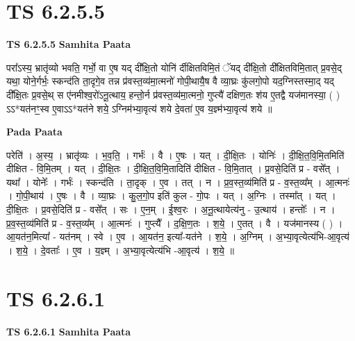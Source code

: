 \documentclass[17pt]{extarticle}
\begin{document}
\section*{ TS 6.2.5.5 }

\textbf{TS 6.2.5.5 } \newline
\textbf{Samhita Paata} \newline

परा᳚ऽस्य॒ भ्रातृ॑व्यो भवति॒ गर्भो॒ वा ए॒ष यद् दी᳚क्षि॒तो योनि॑ र्दीक्षितविमि॒तं ॅयद् दी᳚क्षि॒तो दी᳚क्षितविमि॒तात् प्र॒वसे॒द् यथा॒ योने॒र्गर्भः॒ स्कन्द॑ति ता॒दृगे॒व तन्न प्र॑वस्त॒व्य॑मा॒त्मनो॑ गोपी॒थायै॒ष वै व्या॒घ्रः कु॑लगो॒पो यद॒ग्निस्तस्मा॒द् यद् दी᳚क्षि॒तः प्र॒वसे॒थ् स ए॑नमीश्व॒रो॑ऽनू॒त्थाय॒ हन्तो॒र्न प्र॑वस्त॒व्य॑मा॒त्मनो॒ गुप्त्यै॑ दक्षिण॒तः श॑य ए॒तद्वै यज॑मानस्या॒ ( ) ऽऽ*यत॑नꣳ॒॒स्व ए॒वाऽऽ*यत॑ने शये॒ ऽग्निम॑भ्या॒वृत्य॑ शये दे॒वता॑ ए॒व य॒ज्ञ्म॑भ्या॒वृत्य॑ शये ॥ \newline

\textbf{Pada Paata} \newline

परेति॑ । अ॒स्य॒ । भ्रातृ॑व्यः । भ॒व॒ति॒ । गर्भः॑ । वै । ए॒षः । यत् । दी॒क्षि॒तः । योनिः॑ । दी॒क्षि॒त॒वि॒मि॒तमिति॑ दीक्षित - वि॒मि॒तम् । यत् । दी॒क्षि॒तः । दी॒क्षि॒त॒वि॒मि॒तादिति॑ दीक्षित - वि॒मि॒तात् । प्र॒वसे॒दिति॑ प्र - वसे᳚त् । यथा᳚ । योनेः᳚ । गर्भः॑ । स्कन्द॑ति । ता॒दृक् । ए॒व । तत् । न । प्र॒व॒स्त॒व्य॑मिति॑ प्र - व॒स्त॒व्य᳚म् । आ॒त्मनः॑ । गो॒पी॒थाय॑ । ए॒षः । वै । व्या॒घ्रः । कु॒ल॒गो॒प इति॑ कुल - गो॒पः । यत् । अ॒ग्निः । तस्मा᳚त् । यत् । दी॒क्षि॒तः । प्र॒वसे॒दिति॑ प्र - वसे᳚त् । सः । ए॒न॒म् । ई॒श्व॒रः । अ॒नू॒त्थायेत्य॑नु - उ॒त्थाय॑ । हन्तोः᳚ । न । प्र॒व॒स्त॒व्य॑मिति॑ प्र - व॒स्त॒व्य᳚म् । आ॒त्मनः॑ । गुप्त्यै᳚ । द॒क्षि॒ण॒तः । श॒ये॒ । ए॒तत् । वै । यज॑मानस्य ( ) । आ॒यत॑न॒मित्या᳚ - यत॑नम् । स्वे । ए॒व । आ॒यत॑न॒ इत्या᳚-यत॑ने । श॒ये॒ । अ॒ग्निम् । अ॒भ्या॒वृत्येत्य॑भि-आ॒वृत्य॑ । श॒ये॒ । दे॒वताः᳚ । ए॒व । य॒ज्ञ्म् । अ॒भ्या॒वृत्येत्य॑भि -आ॒वृत्य॑ । श॒ये॒ ॥  \newline




\section*{ TS 6.2.6.1 }

\textbf{TS 6.2.6.1 } \newline
\textbf{Samhita Paata} \newline
\end{document}
